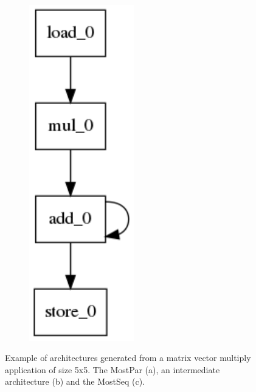 \begin{figure}[ht]
\begin{subfigure}{.3\columnwidth}
  \caption{}
  \label{fig:inter_arch}
\end{subfigure}
\begin{subfigure}{.2\columnwidth}
  \centering
  \includegraphics[width=0.5\textwidth]{images/Architecture_latency_188_schematic.png}
  \caption{}
  \label{fig:most_seq_arch}
\end{subfigure}
    \caption{\small Example of architectures generated from a matrix vector multiply application of size 5x5. The MostPar (a), an intermediate architecture (b) and the MostSeq (c).}
\label{fig:tradeoffs}
\end{figure}

